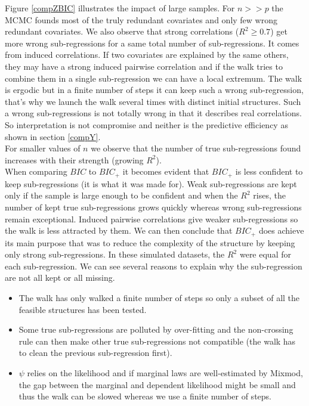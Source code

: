 \documentclass[12pt,a4paper]{report}
\begin{document}
Figure \ref{compZBIC} illustrates the impact of large samples. For $n>>p$ the MCMC founds most of the truly redundant covariates and only few wrong redundant covariates. We also observe that strong correlations ($R^2\geq 0.7$) get more wrong sub-regressions for a same total number of sub-regressions. It comes from induced correlations. If two covariates are explained by the same others, they may have a strong induced pairwise correlation and if the walk tries to combine them in a single sub-regression we can have a local extremum. The walk is ergodic but in a finite number of steps it can keep such a wrong sub-regression, that's why we launch the walk several times with distinct initial structures. Such a wrong sub-regressions is not totally wrong in that it describes real correlations. So interpretation is not compromise and neither is the predictive efficiency as shown in section \ref{compY}. \\
For smaller values of $n$ we observe that the number of true sub-regressions found increases with their strength (growing $R^2$).\\
When comparing $BIC$ to $BIC_+$ it becomes evident that $BIC_+$ is less confident to keep sub-regressions (it is what it was made for). Weak sub-regressions are kept only if the sample is large enough to be confident and when the $R^2$ rises, the number of kept true sub-regressions grows quickly whereas wrong sub-regressions remain exceptional. Induced pairwise correlations give weaker sub-regressions so the walk is less attracted by them. We can then conclude that $BIC_+$ does achieve its main purpose that was to reduce the complexity of the structure by keeping only strong sub-regressions. In these simulated datasets, the $R^2$ were equal for each sub-regression. We can see several reasons to explain why the sub-regression are not all kept or all missing. 
\begin{itemize}
	\item The walk has only walked a finite number of steps so only a subset of all the feasible structures has been tested.
	\item Some true sub-regressions are polluted by over-fitting and the non-crossing rule can then make other true sub-regressions not compatible (the walk has to clean the previous sub-regression first).
	\item $\psi$ relies on the likelihood and if marginal laws are well-estimated by Mixmod, the gap between the marginal and dependent likelihood might be small and thus the walk can be slowed whereas we use a finite number of steps.
\end{itemize}
\end{document}
